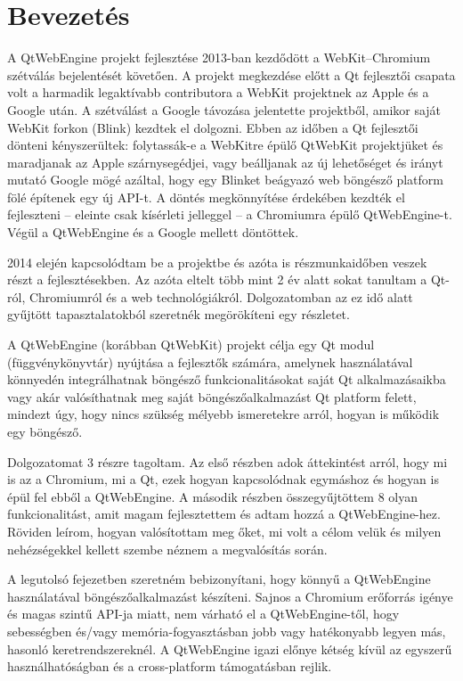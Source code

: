 \documentclass[12pt]{report}
\begin{document}
\chapter*{Bevezetés}
A QtWebEngine projekt fejlesztése 2013-ban kezdődött a WebKit--Chromium szétválás bejelentését
követően. A projekt megkezdése előtt a Qt fejlesztői csapata volt a harmadik legaktívabb
contributora a WebKit projektnek az Apple és a Google után. A szétválást a Google távozása
jelentette projektből, amikor saját WebKit forkon (Blink) kezdtek el dolgozni. Ebben az időben
a Qt fejlesztői dönteni kényszerültek: folytassák-e a WebKitre épülő QtWebKit
projektjüket és maradjanak az Apple szárnysegédjei, vagy beálljanak az új lehetőséget
és irányt mutató Google mögé azáltal, hogy egy Blinket beágyazó web  böngésző platform fölé
építenek egy új API-t. A döntés megkönnyítése érdekében kezdték el fejleszteni -- eleinte csak
kísérleti jelleggel -- a Chromiumra épülő QtWebEngine-t. Végül a QtWebEngine és a Google
mellett döntöttek.
\cite{bib:qt-blog-introducing-qtwebengine}

2014 elején kapcsolódtam be a projektbe és azóta is részmunkaidőben veszek részt a
fejlesztésekben. Az azóta eltelt több mint 2 év alatt sokat tanultam a Qt-ról,
Chromiumról és a web technológiákról. Dolgozatomban az ez idő alatt gyűjtött
tapasztalatokból szeretnék megörökíteni egy részletet.

A QtWebEngine (korábban QtWebKit) projekt célja egy Qt modul (függvénykönyvtár) nyújtása a
fejlesztők számára, amelynek használatával könnyedén integrálhatnak böngésző
funkcionalitásokat saját Qt alkalmazásaikba vagy akár valósíthatnak meg saját
böngészőalkalmazást Qt platform felett, mindezt úgy, hogy nincs szükség mélyebb ismeretekre
arról, hogyan is működik egy böngésző.

Dolgozatomat 3 részre tagoltam. Az első részben adok áttekintést arról, hogy mi is az a
Chromium, mi a Qt, ezek hogyan kapcsolódnak egymáshoz és hogyan is épül fel ebből a
QtWebEngine. A második részben összegyűjtöttem 8 olyan funkcionalitást, amit magam
fejlesztettem és adtam hozzá a QtWebEngine-hez. Röviden leírom, hogyan valósítottam meg
őket, mi volt a célom velük és milyen nehézségekkel kellett szembe néznem a megvalósítás
során.

A legutolsó fejezetben szeretném bebizonyítani, hogy könnyű a QtWebEngine használatával
böngészőalkalmazást készíteni. Sajnos a Chromium erőforrás igénye és magas szintű API-ja
miatt, nem várható el a QtWebEngine-től, hogy sebességben és/vagy memória-fogyasztásban
jobb vagy hatékonyabb legyen más, hasonló keretrendszereknél.
A QtWebEngine igazi előnye kétség kívül az egyszerű használhatóságban és a cross-platform
támogatásban rejlik.
\end{document}

